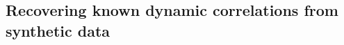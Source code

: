 \documentclass[english]{article}
\begin{document}
\subsection*{Recovering known dynamic correlations from synthetic data}



\end{document}
